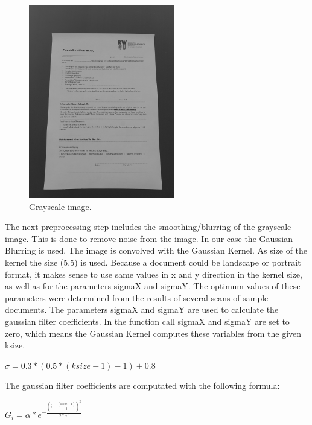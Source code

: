 \documentclass[twocolumn,10pt]{asme2ej}
\begin{document}
\begin{figure}[H]
    \centerline{\includegraphics[width=2.5in]{output/hoch_3_2_grayscaleimg.jpg}}
    \caption{Grayscale image.}
    \label{fig:grayscale}
\end{figure}
The next preprocessing step includes the smoothing/blurring of the grayscale image.
This is done to remove noise from the image\cite{opencv_smoothingimages}. In our case
the Gaussian Blurring\cite{opencv_gaussianblur} is used. The image is convolved with the Gaussian Kernel.
As size of the kernel the size (5,5) is used.
Because a document could be landscape or portrait format, 
it makes sense to use same values in x and y direction in the kernel size, as well as for the parameters
sigmaX and sigmaY.
The optimum values of these parameters were determined from the results of several scans of sample documents.
The parameters sigmaX and sigmaY are used to calculate the gaussian filter coefficients. In the function call
sigmaX and sigmaY are set to zero, which means the Gaussian Kernel computes these variables from the given
ksize\cite{opencv_getgaussiankernel}.
\begin{center}
    $\sigma = 0.3 * (0.5 * (ksize - 1 ) - 1) + 0.8$
    \label{eq_sigma}
\end{center}
The gaussian filter coefficients are computated with the following formula\cite{opencv_getgaussiankernel}:
\begin{center}
    $G_i = \alpha * e^{- \frac{(i - \frac{(ksize - 1)}{2})^2}{2*\sigma^2 } }$
    \label{eq_sigma}
\end{center}
\end{document}
